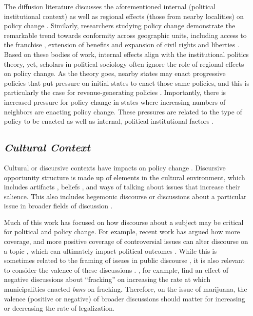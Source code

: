 The diffusion literature discusses the aforementioned internal (political institutional context) as well as regional effects (those from nearby localities) on policy change \citep{bradford_and_bradford_2017,berry_and_berry_1990,glick_and_friedland_2014}. Similarly, researchers studying policy change demonstrate the remarkable trend towards conformity across geographic units, including access to the franchise \citep{uggen_and_manza_2002,manza_and_brooks_1999}, extension of benefits \citep{amenta_2006,amenta_et_al_2005} and expansion of civil rights and liberties \citep{andrews_1997}. Based on these bodies of work, internal effects align with the institutional politics theory, yet, scholars in political sociology often ignore the role of regional effects on policy change. As the theory goes, nearby states may enact progressive policies that put pressure on initial states to enact those same policies, and this is particularly the case for revenue-generating policies \citep{bradford_and_bradford_2017,berry_and_berry_1990}. Importantly, there is increased pressure for policy change in states where increasing numbers of neighbors are enacting policy change.  These pressures are related to the type of policy to be enacted as well as internal, political institutional factors \citep{boushey_2016,berry_and_berry_1990}. 

\subsection{\it{Cultural Context}}


Cultural or discursive contexts have impacts on policy change \citep{vasi_et_al_2015}. Discursive opportunity structure \citep{mccammon_et_al_2007,ghaziani_and_baldassarri_2011} is made up of elements in the cultural environment, which includes artifacts \citep{vasi_et_al_2015}, beliefs \citep{mccammon_et_al_2007}, and ways of talking about issues \citep{bail_2012,bail_et_al_2017} that increase their salience. This also includes hegemonic discourse or discussions about a particular issue in broader fields of discussion \citep{bail_2012,mccammon_et_al_2007}. 


Much of this work has focused on how discourse about a subject may be critical for political and policy change. For example, recent work has argued how more coverage, and more positive coverage of controversial issues \citep{amenta_et_al_2019,amenta_et_al_2009} can alter discourse on a topic \citep{bail_2012,ghaziani_and_baldassarri_2011}, which can ultimately impact political outcomes \citep{vasi_et_al_2015}. While this is sometimes related to the framing of issues in public discourse \citep{benford_and_snow_2000,snow_et_al_2007}, it is also relevant to consider the valence of these discussions \citep{vasi_et_al_2015,seguin_2016}. \citet{vasi_et_al_2015}, for example, find an effect of negative discussions about ``fracking'' on increasing the rate at which municipalities enacted \textit{bans} on fracking. Therefore, on the issue of marijuana, the valence (positive or negative) of broader discussions should matter for increasing or decreasing the rate of legalization. 


